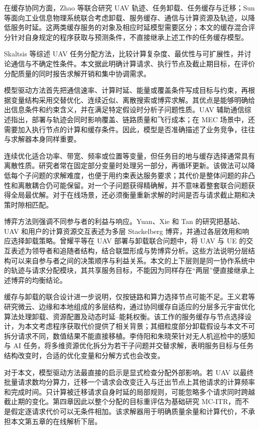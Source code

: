 在缓存协同方面，Zhao 等联合研究 UAV 轨迹、任务卸载、任务缓存与迁移\cite{zhao2025trajectorycache}；Sun 等面向工业信息物理系统联合考虑卸载、服务缓存、通信与计算资源及轨迹，以降低服务时延\cite{sun2025jc5a}。这两类缓存服务的对象及相应时延模型需要区分；本文的缓存混合评分针对自身规定的程序获取与预测条件，不直接继承上述工作的任务缓存模型。


Skaltsis 等综述 UAV 任务分配方法，比较计算复杂度、最优性与可扩展性，并讨论通信与不确定性条件\cite{skaltsis2023allocation}。本文据此明确计算请求、执行节点及截止期目标，在评价分配质量的同时报告求解开销和集中协调需求。

模型驱动方法首先把通信速率、计算时延、能量或覆盖条件写成目标与约束，再根据变量结构采用交替优化、连续近似、离散搜索或博弈求解。其优点是能够明确给出信息条件和约束含义，并在满足特定假设时分析子问题性质。UAV 辅助通信综述指出，部署与轨迹会同时影响覆盖、链路质量和飞行成本\cite{zeng2016wireless,mozaffari2019tutorial}；在 MEC 场景中，还需要加入执行节点的计算和缓存条件。因此，模型是否准确描述了业务竞争，往往与求解器本身同样重要。

连续优化适合功率、带宽、频率或位置等变量，但任务目的地与缓存选择通常具有离散性质。研究者常在固定部分变量时处理另一部分，再循环更新。该做法可以降低每个子问题的求解难度，也便于用约束表达服务要求；其代价是整体问题的非凸性和离散耦合仍可能保留。对一个子问题获得精确解，并不意味着整套联合问题获得全局最优解。对于在线场景，还必须衡量重新求解的时间是否与请求截止期和决策时隙相匹配。

博弈方法则强调不同参与者的利益与响应。Yuan、Xie 和 Tan 的研究把基站、UAV 和用户的计算资源交互表述为多层 Stackelberg 博弈，并通过各层效用和响应选择卸载策略\cite{he2019uav}。曾耀平等在 UAV 部署与卸载联合问题中，将 UAV 与 UE 的交互表述为领导者和追随者结构，结合联盟形成与势博弈分析\cite{zeng2026uav}。这些方法说明分层结构可以来自参与者之间的决策顺序与利益关系。本文的上下层则是同一协作系统中的轨迹与请求分配模块，其共享服务目标，不能因为同样存在“两层”便直接继承上述博弈的均衡结论。

缓存与卸载的联合设计进一步说明，仅按链路和算力选择节点可能不足。王义君等研究微云、边缘和本地组成的多层结构，通过协同缓存自适应的分层多元宇宙优化算法处理卸载、资源配置及动态时延--能耗权衡\cite{wang2026ccah}。该工作的服务缓存与节点选择设计，为本文考虑程序获取代价提供了相关背景；其细粒度部分卸载假设与本文不可拆分请求不同，数值结果不能直接移植。李侍阳和朱晓荣针对无人机巡检中的感知与 AI 任务，将多维资源优化拆分为若干子问题并交替求解\cite{li2026sensing}，表明服务目标与任务结构改变时，合适的优化变量和分解方式也会改变。

对于本文，模型驱动方法最直接的启示是显式检查分配外部影响。若 UAV 以最终批量请求数均分算力，迁移一个请求会改变迁入与迁出节点上其他请求的计算频率和完成时间。只计算被迁移请求自身时延的局部规则，可能忽略多个请求同时跨越截止期的变化。第四章因此以整个分配的目标重评估为基础研究 MC-ITR，而不是假定逐请求代价可以无条件相加。该求解器用于明确质量余量和计算代价，不承担本文第五章的在线解析下层。


